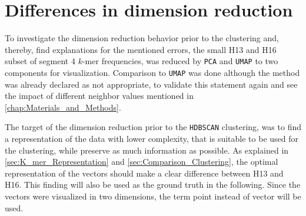 \section{Differences in dimension reduction} \label{sec:Dimension_Reduction}

To investigate the dimension reduction behavior prior to the clustering and, thereby, find explanations for the mentioned errors, the small H13 and H16 subset of segment 4 $k$-mer frequencies, was reduced by \texttt{PCA} and \texttt{UMAP} to two components for visualization. Comparison to \texttt{UMAP} was done although the method was already declared as not appropriate, to validate this statement again and see the impact of different neighbor values mentioned in \autoref{chap:Materials_and_Methods}. 

\vspace{1em}

The target of the dimension reduction prior to the \texttt{HDBSCAN} clustering, was to find a representation of the data with lower complexity, that is suitable to be used for the clustering, while preserve as much information as possible. As explained in \autoref{sec:K_mer_Representation} and \autoref{sec:Comparison_Clustering}, the optimal representation of the vectors should make a clear difference between H13 and H16. This finding will also be used as the ground truth in the following. Since the vectors were visualized in two dimensions, the term point instead of vector will be used.


